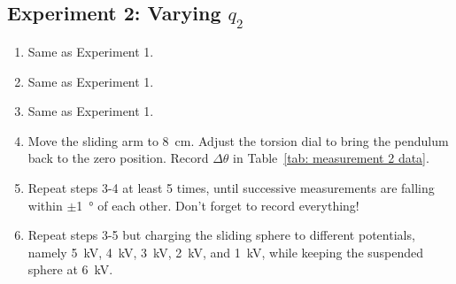 \documentclass[addpoints]{physlabs}
\begin{document}
\begin{labsection}
\begin{experiment}
\subsection*{Experiment 2: Varying $q_2$}\label{subsec: experiment 2}
\begin{enumerate}
    \item Same as Experiment 1.
    \item Same as Experiment 1.
    \item Same as Experiment 1.
    \item Move the sliding arm to \qty{8}{\centi\meter}.
    Adjust the torsion dial to bring the pendulum back to the zero position.
    Record $\Delta\theta$ in Table~\ref{tab: measurement 2 data}.
    \item Repeat steps 3-4 at least 5 times, until successive measurements are falling within $\pm$\qty{1}{\degree} of each other.
    Don't forget to record everything!
    \item Repeat steps 3-5 but charging the sliding sphere to different potentials, namely \qty{5}{\kilo\volt}, \qty{4}{\kilo\volt}, \qty{3}{\kilo\volt}, \qty{2}{\kilo\volt}, and \qty{1}{\kilo\volt}, while keeping the suspended sphere at \qty{6}{\kilo\volt}.
\end{enumerate}

\end{experiment}

\end{labsection}
\end{document}
